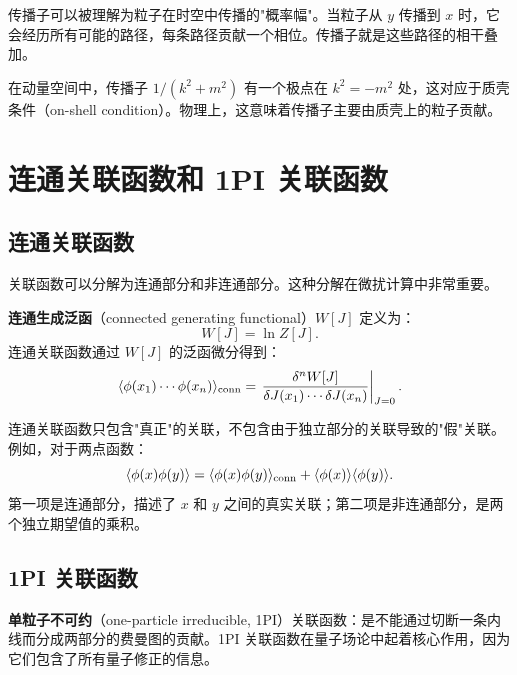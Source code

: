 \begin{note}[传播子的物理图像]
传播子可以被理解为粒子在时空中传播的"概率幅"。当粒子从 $y$ 传播到 $x$ 时，它会经历所有可能的路径，每条路径贡献一个相位。传播子就是这些路径的相干叠加。

在动量空间中，传播子 $1/(k^2 + m^2)$ 有一个极点在 $k^2 = -m^2$ 处，这对应于质壳条件（on-shell condition）。物理上，这意味着传播子主要由质壳上的粒子贡献。
\end{note}

\section{连通关联函数和 1PI 关联函数}

\subsection{连通关联函数}

关联函数可以分解为连通部分和非连通部分。这种分解在微扰计算中非常重要。

\begin{definition}[连通关联函数]
\textbf{连通生成泛函}（connected generating functional）$W[J]$ 定义为：
\begin{equation}
    W[J] = \ln Z[J].
\end{equation}
连通关联函数通过 $W[J]$ 的泛函微分得到：
\begin{equation}
    \langle \phi(x_1) \cdots \phi(x_n) \rangle_{\rm conn} = \left. \frac{\delta^n W[J]}{\delta J(x_1) \cdots \delta J(x_n)} \right|_{J=0}.
\end{equation}
\end{definition}

\begin{note}[连通与非连通的区别]
连通关联函数只包含"真正"的关联，不包含由于独立部分的关联导致的"假"关联。例如，对于两点函数：
\begin{equation}
    \langle \phi(x) \phi(y) \rangle = \langle \phi(x) \phi(y) \rangle_{\rm conn} + \langle \phi(x) \rangle \langle \phi(y) \rangle.
\end{equation}
第一项是连通部分，描述了 $x$ 和 $y$ 之间的真实关联；第二项是非连通部分，是两个独立期望值的乘积。
\end{note}

\subsection{1PI 关联函数}

\begin{definition}[1PI 关联函数]
\textbf{单粒子不可约}（one-particle irreducible, 1PI）关联函数：是不能通过切断一条内线而分成两部分的费曼图的贡献。1PI 关联函数在量子场论中起着核心作用，因为它们包含了所有量子修正的信息。
\end{definition}

